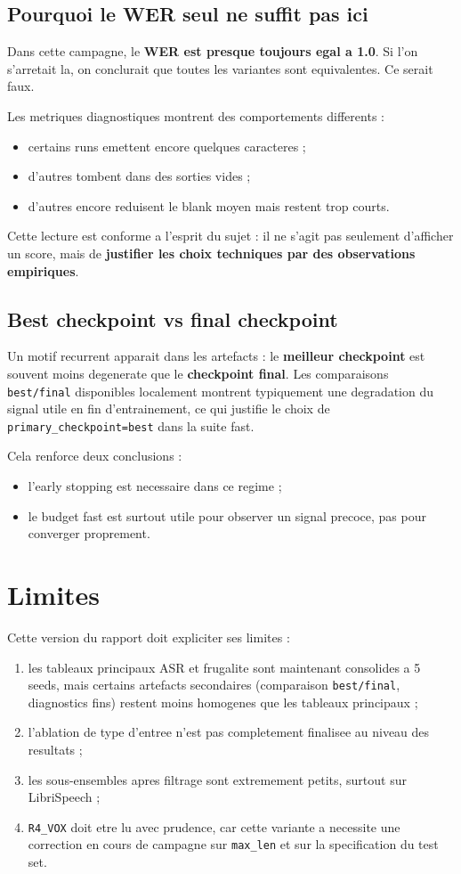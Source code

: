 \documentclass[11pt,a4paper]{article}
\begin{document}
\subsection{Pourquoi le WER seul ne suffit pas ici}
Dans cette campagne, le \textbf{WER est presque toujours egal a 1.0}. Si l'on s'arretait la, on conclurait que toutes les variantes sont equivalentes. Ce serait faux.

Les metriques diagnostiques montrent des comportements differents :
\begin{itemize}[leftmargin=1.2cm]
\item certains runs emettent encore quelques caracteres ;
\item d'autres tombent dans des sorties vides ;
\item d'autres encore reduisent le blank moyen mais restent trop courts.
\end{itemize}

Cette lecture est conforme a l'esprit du sujet : il ne s'agit pas seulement d'afficher un score, mais de \textbf{justifier les choix techniques par des observations empiriques}.

\subsection{Best checkpoint vs final checkpoint}
Un motif recurrent apparait dans les artefacts : le \textbf{meilleur checkpoint} est souvent moins degenerate que le \textbf{checkpoint final}. Les comparaisons \texttt{best/final} disponibles localement montrent typiquement une degradation du signal utile en fin d'entrainement, ce qui justifie le choix de \texttt{primary\_checkpoint=best} dans la suite fast.

Cela renforce deux conclusions :
\begin{itemize}[leftmargin=1.2cm]
\item l'early stopping est necessaire dans ce regime ;
\item le budget fast est surtout utile pour observer un signal precoce, pas pour converger proprement.
\end{itemize}

\section{Limites}
Cette version du rapport doit expliciter ses limites :
\begin{enumerate}[leftmargin=1.2cm]
\item les tableaux principaux ASR et frugalite sont maintenant consolides a 5 seeds, mais certains artefacts secondaires (comparaison \texttt{best/final}, diagnostics fins) restent moins homogenes que les tableaux principaux ;
\item l'ablation de type d'entree n'est pas completement finalisee au niveau des resultats ;
\item les sous-ensembles apres filtrage sont extremement petits, surtout sur LibriSpeech ;
\item \texttt{R4\_VOX} doit etre lu avec prudence, car cette variante a necessite une correction en cours de campagne sur \texttt{max\_len} et sur la specification du test set.
\end{enumerate}
\end{document}
